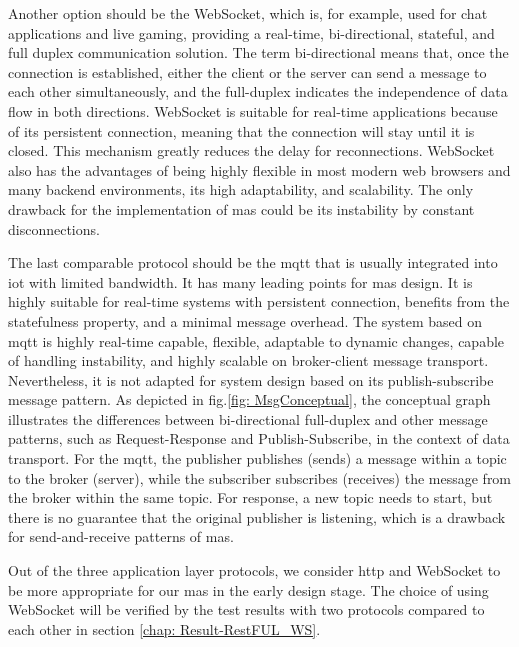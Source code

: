 Another option should be the WebSocket, which is, for example, used for chat 
applications and live gaming, providing a real-time, bi-directional, stateful, and full 
duplex communication 
solution. The term bi-directional means that, once the connection is established, 
either the client or the server can send a message to each other simultaneously, and the full-duplex indicates the independence of data flow in both directions. WebSocket is suitable 
for real-time applications because of its persistent connection, meaning that the connection 
will stay until it is closed. This mechanism greatly reduces the delay for 
reconnections. WebSocket also has the advantages of being highly flexible in most modern 
web browsers and many backend environments, its high adaptability, and scalability. The only 
drawback for the implementation of \gls{mas} could be its instability by constant disconnections. 


The last comparable protocol should be the \gls{mqtt} that is usually integrated into 
\gls{iot} with limited bandwidth. It has many leading points for 
\gls{mas} design. It is highly suitable for real-time systems with persistent connection, 
benefits from the statefulness property, and a minimal message overhead. The system 
based on \gls{mqtt} is highly real-time capable, flexible, adaptable to dynamic changes, 
capable of handling instability, and highly scalable on broker-client message transport. 
Nevertheless, it is not adapted for system design based on its publish-subscribe message pattern. 
As depicted in fig.\ref{fig: MsgConceptual}, the conceptual graph illustrates 
the differences between bi-directional 
full-duplex and other message patterns, such as Request-Response and Publish-Subscribe, 
in the context of data transport.
For the \gls{mqtt}, the publisher publishes (sends) a 
message within a topic to the broker (server), while the subscriber 
subscribes (receives) the message from the broker within the same topic. 
For response, a new topic needs to start, but there is no guarantee that the original publisher is listening, 
which is a drawback for send-and-receive patterns of \gls{mas}. 

Out of the three application layer protocols, we consider \gls{http} and 
WebSocket to be more appropriate for our 
\gls{mas} in the early design stage. The choice of using WebSocket will be verified 
by the test results with two protocols compared to each other in section \ref{chap: Result-RestFUL_WS}.


